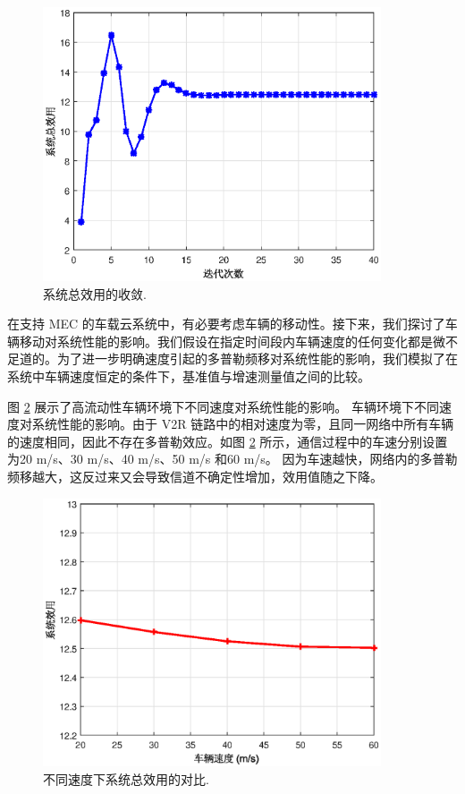 \begin{figure}[H]
\centering
\includegraphics[width=10cm]{figures//chap3//ee.eps}
\caption{系统总效用的收敛.}
\label{F4}
\end{figure}

在支持 MEC 的车载云系统中，有必要考虑车辆的移动性。接下来，我们探讨了车辆移动对系统性能的影响。我们假设在指定时间段内车辆速度的任何变化都是微不足道的。为了进一步明确速度引起的多普勒频移对系统性能的影响，我们模拟了在系统中车辆速度恒定的条件下，基准值与增速测量值之间的比较。

图 \ref{F5} 展示了高流动性车辆环境下不同速度对系统性能的影响。
车辆环境下不同速度对系统性能的影响。由于 V2R 链路中的相对速度为零，且同一网络中所有车辆的速度相同，因此不存在多普勒效应。如图 \ref{F5} 所示，通信过程中的车速分别设置为20 m/s、30 m/s、40 m/s、50 m/s 和60 m/s。 因为车速越快，网络内的多普勒频移越大，这反过来又会导致信道不确定性增加，效用值随之下降。
\begin{figure}[H]
\centering
\includegraphics[width=10cm]{figures//chap3//diffspeed1.eps}
\caption{不同速度下系统总效用的对比.}
\label{F5}
\end{figure}

